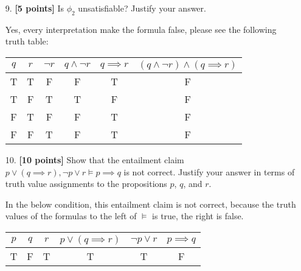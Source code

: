 \documentclass{article}
\begin{document}
\begin{enumerate}
\item[9.] \textbf{[5 points]} Is $\phi_2$ unsatisfiable?  Justify your answer.
  
   \begin{answer}
    Yes, every interpretation make the formula false, please see the following truth table:\\
     \begin{tabular}{|c|c|c|c|c|c|} \hline
        $q$ & $r$ & $\neg r$ & $q \land \neg r$ & $q \implies r$ & $(q \land \neg r) \land (q \implies r)$\\ \hline
        T & T & F & F & T & F \\ \hline
        T & F & T & T & F & F \\ \hline
        F & T & F & F & T & F \\ \hline
        F & F & T & F & T & F \\ \hline
    \end{tabular}
    \end{answer}
    
\end{enumerate}

\begin{enumerate}
\item[10.] \textbf{[10 points]} Show that the entailment claim
  $p \lor (q \implies r), \neg p \lor r \models p \implies q$ is not
  correct.  Justify your answer in terms of truth value assignments to
  the propositions $p$, $q$, and $r$.
  
   \begin{answer}
        In the below condition, this entailment claim is not correct, because the truth values of the formulas to the left of $\models$ is true, the right is false. \\
        \begin{tabular}{|c|c|c|c|c|c|} \hline
         $p$ & $q$ & $r$ & $p \lor (q \implies r)$ & $ \neg p \lor r$ & $p \implies q$ \\ \hline
        T & F & T & T & T & F \\ \hline
        \end{tabular}
    \end{answer}
    
\end{enumerate}
\end{document}
